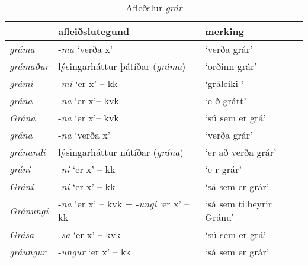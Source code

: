 \documentclass[../samsetningasafn.tex]{subfiles}
\begin{document}
\begin{table}[ht!]%
\begin{footnotesize}
\begin{tcolorbox}
	\begin{center}
	\begin{tabularx}{\textwidth}{Xll}
						&	\textbf{afleiðslutegund}					&	\textbf{merking}	\\
	\hline
	\textit{gráma}		&	-\textit{ma} \lq verða x\rq{}			&	\lq verða grár\rq	\\
	\textit{grámaður}		&	lýsingarháttur þátíðar (\textit{gráma})		&	\lq orðinn grár\rq	\\
	\textit{grámi}		&	-\textit{mi} \lq er x\rq{} -- kk 			&	\lq gráleiki \rq	\\
	\textit{grána}		&	-\textit{na} \lq er x\rq -- kvk				&	\lq e-ð grátt\rq	\\
	\textit{Grána}		&	-\textit{na} \lq er x\rq -- kvk				&	\lq sú sem er grá\rq	\\
	\textit{grána}		&	-\textit{na} \lq verða x\rq				&	\lq verða grár\rq	\\
	\textit{gránandi}		&	lýsingarháttur nútíðar (\textit{grána})		&	\lq er að verða grár\rq	\\
	\textit{gráni}		&	-\textit{ni} \lq er x\rq{} -- kk				&	\lq e-r grár\rq	\\
	\textit{Gráni}		&	-\textit{ni} \lq er x\rq{} -- kk				&	\lq sá sem er grár\rq	\\
	\textit{Gránungi}	&	-\textit{na} \lq er x\rq{} -- kvk + -\textit{ungi} \lq er x\rq{} -- kk			&	\lq sá sem tilheyrir Gránu\rq		\\
	\textit{Grása}		&	-\textit{sa} \lq er x\rq{} -- kvk			&	\lq sú sem er grá\rq		\\
	\textit{gráungur}	&	-\textit{ungur} \lq er x\rq{} -- kk			&	\lq sá sem er grár\rq		\\
	\end{tabularx}
	\end{center}
\end{tcolorbox}
\end{footnotesize}
	\caption{Afleðslur \textit{grár}}
	\label{tafla:grafl}
\end{table}

\clearpage
\end{document}
